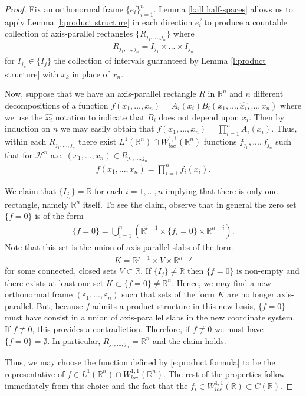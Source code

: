 \documentclass[12pt]{amsart}
\numberwithin{equation}{section}
\theoremstyle{plain}
\theoremstyle{definition}
\begin{document}
\begin{proof}
Fix an orthonormal frame $\{\vec{e_i}\}_{i=1}^n$.  Lemma \ref{l:all half-spaces} allows us to apply Lemma \ref{l:product structure} in each direction $\vec{e_i}$ to produce a countable collection of axis-parallel rectangles $\{R_{j_1, ..., j_n}\}$ where 
\begin{align*}
    R_{j_1, ..., j_n} = I_{j_1} \times ... \times I_{j_n}
\end{align*}
for $I_{j_k} \in \{I_j\}$ the collection of intervals guaranteed by Lemma \ref{l:product structure} with $x_k$ in place of $x_n$.  

Now, suppose that we have an axis-parallel rectangle $R$ in $\mathbb{R}^n$ and $n$ different decompositions of a function $f(x_1, ..., x_n) = A_i(x_i)B_i(x_1, ..., \hat{x_i}, ..., x_n)$ where we use the $\hat{x_i}$ notation to indicate that $B_i$ does not depend upon $x_i$. Then by induction on $n$ we may easily obtain that $f(x_1, ..., x_n) = \prod_{i=1}^n A_i(x_i)$.  Thus, within each $R_{j_1, ..., j_n}$ there exist $L^1(\mathbb{R}^n) \cap W^{1,1}_{loc}(\mathbb{R}^n)$ functions $f_{j_1}, ..., f_{j_n}$ such that for $\mathcal{H}^{n}$-a.e. $(x_1, ..., x_n) \in R_{j_1, ..., j_n}$ 
\begin{align*}
    f(x_1, ..., x_n) = \prod_{i=1}^n f_i(x_i).
\end{align*}

We claim that $\{I_{j_i}\} = \mathbb{R}$ for each $i =1, ..., n$ implying that there is only one rectangle, namely $\mathbb{R}^n$ itself.  To see the claim, observe that in general the zero set $\{f=0\}$ is of the form
\begin{align*}
    \{f=0\} = \bigcup_{i=1}^n\left(\mathbb{R}^{i-1} \times \{f_i=0\} \times \mathbb{R}^{n-i}\right).
\end{align*}
Note that this set is the union of axis-parallel slabs of the form
\begin{align*}
   K= \mathbb{R}^{j-1} \times V \times \mathbb{R}^{n-j}
\end{align*}
for some connected, closed sets $V \subset \mathbb{R}$. If $\{I_{j}\} \not = \mathbb{R}$ then $\{f=0\}$ is non-empty and there exists at least one set $K \subset \{f=0\} \not=\mathbb{R}^n$.  Hence, we may find a new orthonormal frame $(\varepsilon_1, ...,\varepsilon_{n})$ such that sets of the form $K$ are no longer axis-parallel.  But, because $f$ admits a product structure in this new basis, $\{f=0\}$ must have consist in a union of axis-parallel slabs in the new coordinate system.  If $f \not\equiv 0$, this provides a contradiction. Therefore, if $f\not \equiv 0$ we must have $\{f=0 \} = \emptyset$.  In particular, $R_{j_1, ..., j_n} = \mathbb{R}^n$ and the claim holds.

Thus, we may choose the function defined by \eqref{e:product formula} to be the representative of $f \in L^1(\mathbb{R}^n) \cap W^{1, 1}_{loc}(\mathbb{R}^n)$. The rest of the properties follow immediately from this choice and the fact that the $f_i \in W^{1,1}_{loc}(\mathbb{R}) \subset C(\mathbb{R})$.
\end{proof}
\end{document}
